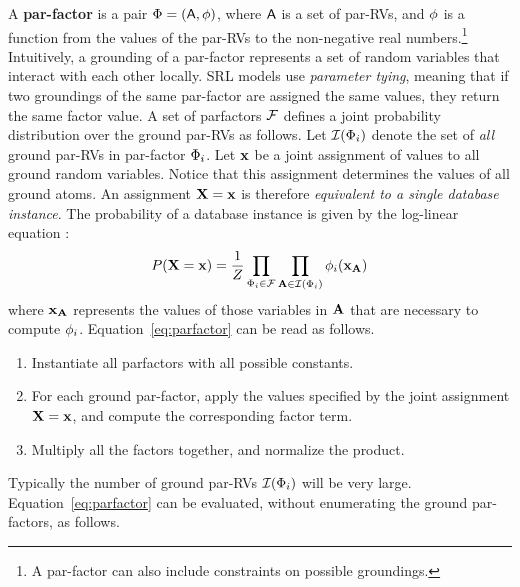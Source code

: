 \documentclass{IEEEtran}
\begin{document}
A \textbf{par-factor} is a pair $\Phi = (\mathsf{A},\phi)$, where $\mathsf{A}$ is a set of par-RVs, and $\phi$ is a function from the values of the par-RVs to the non-negative real numbers.\footnote{A par-factor can also include constraints on possible groundings.} Intuitively, a grounding of a par-factor represents a set of random variables that interact with each other locally. SRL models use {\em parameter tying}, meaning that if two groundings of the same par-factor are assigned the same values, they return the same factor value. A set of parfactors $\mathcal{F}$ defines a joint probability distribution over the ground par-RVs as follows. Let $\mathcal{I}(\Phi_{i})$ denote the set of {\em all} ground par-RVs in par-factor $\Phi_{i}$. Let $\mathbf{x}$ be a joint assignment of values to all ground random variables. Notice that this assignment determines the values of all ground atoms. An assignment $\mathbf{X}=\mathbf{x}$ is therefore {\em equivalent to a single database instance}.
The probability of a database instance is given by the log-linear equation \cite[Eq.7]{Kimmig2015}:
\begin{equation} \label{eq:parfactor}
P(\set{X}=\set{x}) = \frac{1}{Z} \prod_{\parfactor_{i} \in \parfactors} \prod_{\gparrvs \in \instantiations(\parfactor_{i})} 
\potential_{i}(\set{x}_{\gparrvs}) 
\end{equation}
where $\mathbf{x}_{\mathbf{A}}$ represents the values of those variables in $\mathbf{A}$ that are necessary to compute $\phi_{i}$. 
Equation~\ref{eq:parfactor} can be read as follows.

\begin{enumerate}
\item Instantiate all parfactors with all possible constants. 
\item For each ground par-factor, apply the values specified by the joint assignment  $\mathbf{X}=\mathbf{x}$, and compute the corresponding factor term.
\item Multiply all the factors together, and normalize the product.  
\end{enumerate}


Typically the number of ground par-RVs $\mathcal{I}(\Phi_{i})$ will be very large.  
Equation~\ref{eq:parfactor} can be evaluated, without enumerating the ground par-factors, 
as follows. 
%
%
\end{document}
